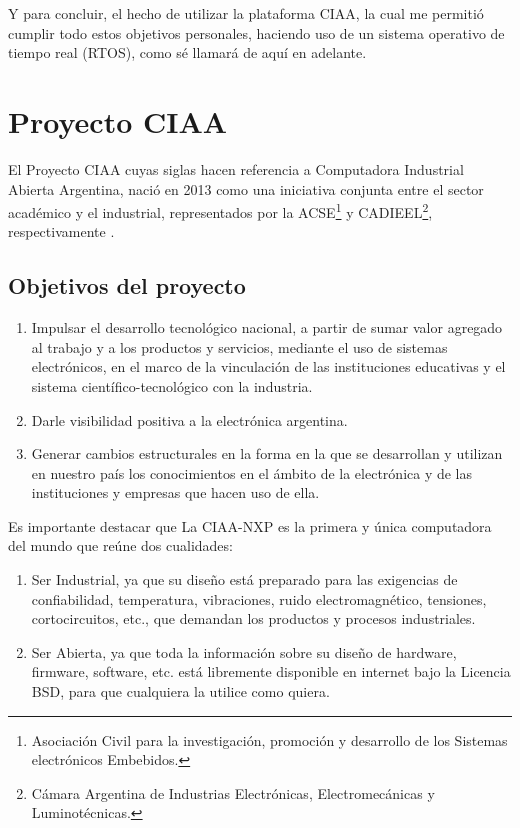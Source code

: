 Y para concluir, el hecho de utilizar la plataforma CIAA, la cual me permitió cumplir todo estos objetivos personales, haciendo uso de un sistema operativo de tiempo real (RTOS), como sé llamará de aquí en adelante.



\section{Proyecto CIAA}

El Proyecto CIAA cuyas siglas hacen referencia a Computadora Industrial Abierta Argentina, nació en 2013 como una iniciativa conjunta entre el sector académico y el industrial, representados por la ACSE\footnote{Asociación Civil para la investigación, promoción y desarrollo de los Sistemas electrónicos Embebidos.} y CADIEEL\footnote{Cámara Argentina de Industrias Electrónicas, Electromecánicas y Luminotécnicas.}, respectivamente \citep{CIAA}.

\subsection{Objetivos del proyecto}
\begin{enumerate}
  \item Impulsar el desarrollo tecnológico nacional, a partir de sumar valor agregado al trabajo y a los productos y servicios, mediante el uso de sistemas electrónicos, en el marco de la vinculación de las instituciones educativas y el sistema científico-tecnológico con la industria.
  \item Darle visibilidad positiva a la electrónica argentina.
  \item Generar cambios estructurales en la forma en la que se desarrollan y utilizan en nuestro país los conocimientos en el ámbito de la electrónica y de las instituciones y empresas que hacen uso de ella.
\end{enumerate}

Es importante destacar que La CIAA-NXP es la primera y única computadora del mundo que reúne dos cualidades:

\begin{enumerate}
  \item Ser Industrial, ya que su diseño está preparado para las exigencias de confiabilidad, temperatura, vibraciones, ruido electromagnético, tensiones, cortocircuitos, etc., que demandan los productos y procesos industriales.
  \item Ser Abierta, ya que toda la información sobre su diseño de hardware, firmware, software, etc. está libremente disponible en internet bajo la Licencia BSD, para que cualquiera la utilice como quiera.
\end{enumerate}

